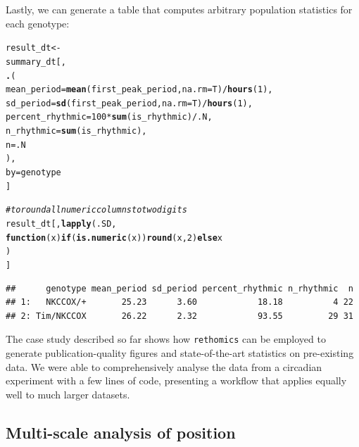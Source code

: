 \documentclass[10pt,letterpaper]{article}\usepackage[]{graphicx}\usepackage[]{color}
\makeatletter
\newcommand{\hlnum}[1]{\textcolor[rgb]{0.686,0.059,0.569}{#1}}%
\newcommand{\hlcom}[1]{\textcolor[rgb]{0.678,0.584,0.686}{\textit{#1}}}%
\newcommand{\hlopt}[1]{\textcolor[rgb]{0,0,0}{#1}}%
\newcommand{\hlstd}[1]{\textcolor[rgb]{0.345,0.345,0.345}{#1}}%
\newcommand{\hlkwa}[1]{\textcolor[rgb]{0.161,0.373,0.58}{\textbf{#1}}}%
\newcommand{\hlkwb}[1]{\textcolor[rgb]{0.69,0.353,0.396}{#1}}%
\newcommand{\hlkwc}[1]{\textcolor[rgb]{0.333,0.667,0.333}{#1}}%
\newcommand{\hlkwd}[1]{\textcolor[rgb]{0.737,0.353,0.396}{\textbf{#1}}}%
\newenvironment{kframe}{%
 \def\at@end@of@kframe{}%
 \ifinner\ifhmode%
  \def\at@end@of@kframe{\end{minipage}}%
  \begin{minipage}{\columnwidth}%
 \fi\fi%
 \def\FrameCommand##1{\hskip\@totalleftmargin \hskip-\fboxsep
 \colorbox{shadecolor}{##1}\hskip-\fboxsep
     \hskip-\linewidth \hskip-\@totalleftmargin \hskip\columnwidth}%
 \MakeFramed {\advance\hsize-\width
   \@totalleftmargin\z@ \linewidth\hsize
   \@setminipage}}%
 {\par\unskip\endMakeFramed%
 \at@end@of@kframe}
\newenvironment{knitrout}{}{} %
\makeatother
\begin{document}
Lastly, we can generate a table that computes arbitrary population statistics for each genotype:
\begin{knitrout}
\color{fgcolor}\begin{kframe}
\begin{alltt}
\hlstd{result_dt} \hlkwb{<-}
  \hlstd{summary_dt[,}
    \hlkwd{.}\hlstd{(}
       \hlkwc{mean_period} \hlstd{=} \hlkwd{mean}\hlstd{(first_peak_period,} \hlkwc{na.rm} \hlstd{= T)} \hlopt{/} \hlkwd{hours}\hlstd{(}\hlnum{1}\hlstd{),}
       \hlkwc{sd_period} \hlstd{=} \hlkwd{sd}\hlstd{(first_peak_period,} \hlkwc{na.rm} \hlstd{= T)} \hlopt{/} \hlkwd{hours}\hlstd{(}\hlnum{1}\hlstd{),}
       \hlkwc{percent_rhythmic} \hlstd{=} \hlnum{100} \hlopt{*} \hlkwd{sum}\hlstd{(is_rhythmic)} \hlopt{/} \hlstd{.N,}
       \hlkwc{n_rhythmic} \hlstd{=} \hlkwd{sum}\hlstd{(is_rhythmic),}
       \hlkwc{n} \hlstd{= .N}
     \hlstd{),}
    \hlkwc{by} \hlstd{= genotype}
  \hlstd{]}

\hlcom{# to round all numeric columns  to two digits}
\hlstd{result_dt[,} \hlkwd{lapply}\hlstd{(.SD,}
                   \hlkwa{function}\hlstd{(}\hlkwc{x}\hlstd{)} \hlkwa{if}\hlstd{(}\hlkwd{is.numeric}\hlstd{(x))} \hlkwd{round}\hlstd{(x,} \hlnum{2}\hlstd{)} \hlkwa{else} \hlstd{x}
                   \hlstd{)}
           \hlstd{]}
\end{alltt}
\begin{verbatim}
##      genotype mean_period sd_period percent_rhythmic n_rhythmic  n
## 1:   NKCCOX/+       25.23      3.60            18.18          4 22
## 2: Tim/NKCCOX       26.22      2.32            93.55         29 31
\end{verbatim}
\end{kframe}
\end{knitrout}



The case study described so far shows how \texttt{rethomics} can be employed to generate publication-quality figures and state-of-the-art statistics on pre-existing data.
We were able to comprehensively analyse the data from a circadian experiment with a few lines of code,
presenting a workflow that applies equally well to much larger datasets.


\subsection*{Multi-scale analysis of position}
\end{document}
